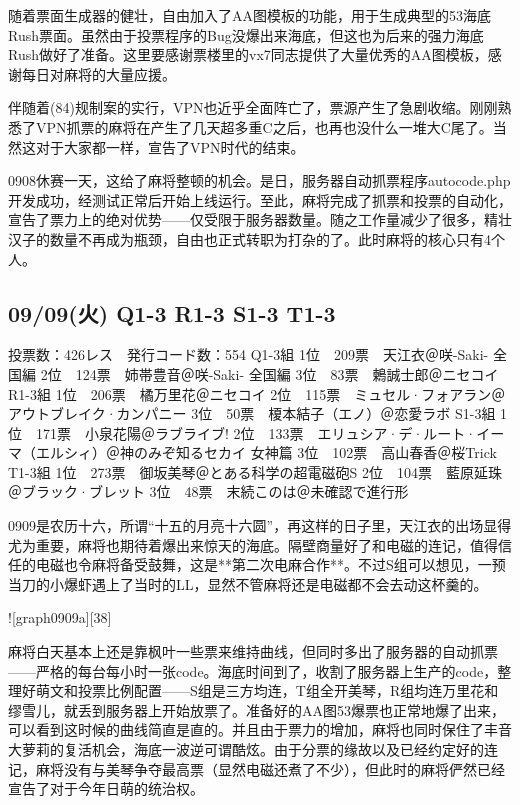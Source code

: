 随着票面生成器的健壮，自由加入了AA图模板的功能，用于生成典型的53海底Rush票面。虽然由于投票程序的Bug没爆出来海底，但这也为后来的强力海底Rush做好了准备。这里要感谢票楼里的vx7同志提供了大量优秀的AA图模板，感谢每日对麻将的大量应援。

伴随着(84)规制案的实行，VPN也近乎全面阵亡了，票源产生了急剧收缩。刚刚熟悉了VPN抓票的麻将在产生了几天超多重C之后，也再也没什么一堆大C尾了。当然这对于大家都一样，宣告了VPN时代的结束。

0908休赛一天，这给了麻将整顿的机会。是日，服务器自动抓票程序autocode.php开发成功，经测试正常后开始上线运行。至此，麻将完成了抓票和投票的自动化，宣告了票力上的绝对优势——仅受限于服务器数量。随之工作量减少了很多，精壮汉子的数量不再成为瓶颈，自由也正式转职为打杂的了。此时麻将的核心只有4个人。

\subsection{09/09(火) Q1-3 R1-3 S1-3 T1-3}

    投票数：426レス　発行コード数：554
    Q1-3組
    1位　209票　天江衣＠咲-Saki- 全国編
    2位　124票　姉帯豊音＠咲-Saki- 全国編
    3位　83票　鶫誠士郎＠ニセコイ
    R1-3組
    1位　206票　橘万里花＠ニセコイ
    2位　115票　ミュセル·フォアラン＠アウトブレイク·カンパニー
    3位　50票　榎本結子（エノ）＠恋愛ラボ
    S1-3組
    1位　171票　小泉花陽＠ラブライブ!
    2位　133票　エリュシア·デ·ルート·イーマ（エルシィ）＠神のみぞ知るセカイ 女神篇
    3位　102票　高山春香＠桜Trick
    T1-3組
    1位　273票　御坂美琴＠とある科学の超電磁砲S
    2位　104票　藍原延珠＠ブラック·ブレット
    3位　48票　末続このは＠未確認で進行形

0909是农历十六，所谓“十五的月亮十六圆”，再这样的日子里，天江衣的出场显得尤为重要，麻将也期待着爆出来惊天的海底。隔壁商量好了和电磁的连记，值得信任的电磁也令麻将备受鼓舞，这是**第二次电麻合作**。不过S组可以想见，一预当刀的小爆虾遇上了当时的LL，显然不管麻将还是电磁都不会去动这杯羹的。

![graph0909a][38]

麻将白天基本上还是靠枫叶一些票来维持曲线，但同时多出了服务器的自动抓票——严格的每台每小时一张code。海底时间到了，收割了服务器上生产的code，整理好萌文和投票比例配置——S组是三方均连，T组全开美琴，R组均连万里花和缪雪儿，就丢到服务器上开始放票了。准备好的AA图53爆票也正常地爆了出来，可以看到这时候的曲线简直是直的。并且由于票力的增加，麻将也同时保住了丰音大萝莉的复活机会，海底一波逆可谓酷炫。由于分票的缘故以及已经约定好的连记，麻将没有与美琴争夺最高票（显然电磁还煮了不少），但此时的麻将俨然已经宣告了对于今年日萌的统治权。


